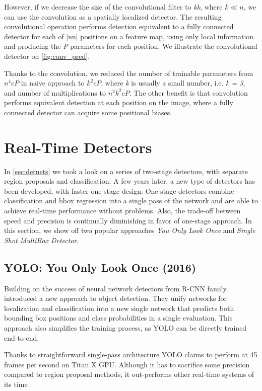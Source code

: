 However, if we decrease the size of the convolutional filter to \textit{k\x k}, where $k \ll n$, we can use the convolution as a spatially localized detector. The resulting convolutional operation performs detection equivalent to a fully connected detector for each of [n\x n] positions on a feature map, using only local information and producing the \textit{P} parameters for each position. We illustrate the convolutional detector on \cref{fig:conv_pred}.

Thanks to the convolution, we reduced the number of trainable parameters from $n^4cP$ in naive approach to $k^2cP$, where \textit{k} is usually a small number, i.e. \textit{k = 3}, and number of multiplications to $n^2k^2cP$. The other benefit is that convolution performs equivalent detection at each position on the image, where a fully connected detector can acquire some positional biases.



\section{Real-Time Detectors}
\label{sec:rltm}
In \cref{sec:detnets} we took a look on a series of two-stage detectors, with separate region proposals and classification. A few years later, a new type of detectors has been developed, with faster one-stage design. One-stage detectors combine classification and bbox regression into a single pass of the network and are able to achieve real-time performance without problems. Also, the trade-off between speed and precision is continually diminishing in favor of one-stage approach. In this section, we show off two popular approaches \textit{You Only Look Once} and \textit{Single Shot MultiBox Detector}.

\subsection{YOLO: You Only Look Once (2016)}
\label{sec:yolo}
Building on the success of neural network detectors from R-CNN family. \citeauthor{bib:yolo} \cite{bib:yolo} introduced a new approach to object detection. They unify networks for localization and classification into a new single network that predicts both bounding box positions and class probabilities in a single evaluation. This approach also simplifies the training process, as YOLO can be directly trained end-to-end. 

Thanks to straightforward single-pass architecture YOLO claims to perform at 45 frames per second on Titan X GPU. Although it has to sacrifice some precision compared to region proposal methods, it out-performs other real-time systems of its time \cite{bib:overfeat}.


